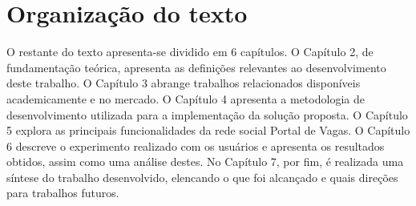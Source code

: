 \section{Organização do texto}
\label{introducaoOrganizacao}
O restante do texto apresenta-se dividido em 6 capítulos. O Capítulo 2, de fundamentação teórica, apresenta as definições relevantes ao desenvolvimento deste trabalho. O Capítulo 3 abrange trabalhos relacionados disponíveis academicamente e no mercado. O Capítulo 4 apresenta a metodologia de desenvolvimento utilizada para a implementação da solução proposta. O Capítulo 5 explora as principais funcionalidades da rede social Portal de Vagas. O Capítulo 6 descreve o experimento realizado com os usuários e apresenta os resultados obtidos, assim como uma análise destes. No Capítulo 7, por fim, é realizada uma síntese do trabalho desenvolvido, elencando o que foi alcançado e quais direções para trabalhos futuros.
